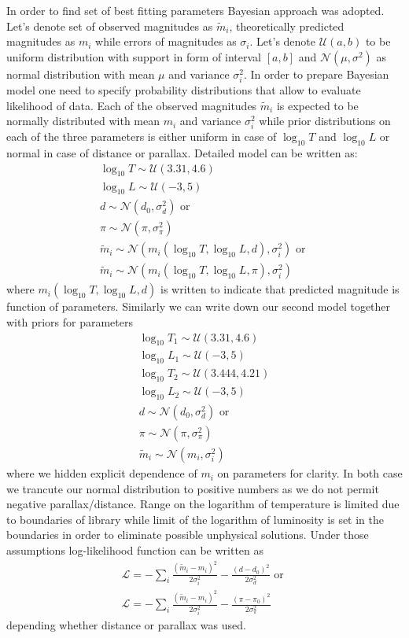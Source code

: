 \documentclass{pracalicmgr}
\begin{document}
In order to find set of best fitting parameters Bayesian approach was adopted. Let's denote set of observed magnitudes as $\tilde{m}_i$, theoretically predicted
magnitudes as $m_i$ while errors of magnitudes as $\sigma_i$. Let's denote $\mathcal{U}(a,b)$ to be uniform distribution with support in form of interval $[a,b]$ and $\mathcal{N}(\mu,\sigma^2)$ as
normal distribution with mean $\mu$ and variance $\sigma_i^2$. In order to prepare Bayesian model one need to specify probability distributions that allow to evaluate likelihood of 
data. Each of the observed magnitudes $\tilde{m}_i$ is expected to be normally distributed with mean $m_i$ and variance $\sigma_i^2$ while prior distributions on each of the three parameters
is either uniform in case of $\log_{10} T$ and $\log_{10} L$ or normal in case of distance or parallax. Detailed model can be written as:
\begin{align}
    \log_{10}{T}\sim \mathcal{U}(3.31,4.6)\\
    \log_{10}{L} \sim \mathcal{U}(-3,5)\\
    d \sim \mathcal{N}(d_0,\sigma_d^2) \textrm{ or } \\
    \pi \sim \mathcal{N} (\pi,\sigma_{\pi}^2)\\
    \tilde{m}_i\sim \mathcal{N}(m_i(\log_{10} T, \log_{10} L, d ),\sigma_i^2) \textrm{ or }\\
    \tilde{m}_i\sim \mathcal{N}(m_i(\log_{10} T, \log_{10} L, \pi ),\sigma_i^2)
\end{align}
where  $m_i(\log_{10} T, \log_{10} L, d )$ is written to indicate that predicted magnitude is function of parameters. 
Similarly we can write down our second model together with priors for parameters
\begin{align}
    \log_{10}{T_1}\sim \mathcal{U}(3.31,4.6)\\
    \log_{10}{L_1} \sim \mathcal{U}(-3,5)\\
    \log_{10}{T_2}\sim \mathcal{U}(3.444,4.21)\\
    \log_{10}{L_2} \sim \mathcal{U}(-3,5)\\
    d \sim \mathcal{N}(d_0,\sigma_d^2) \textrm{ or } \\
    \pi \sim \mathcal{N} (\pi,\sigma_{\pi}^2)\\
    \tilde{m}_i\sim \mathcal{N}(m_i,\sigma_i^2)
\end{align}
where we hidden explicit dependence of $m_i$ on parameters for clarity. In both case we trancute our normal distribution to positive numbers as we do 
not permit negative parallax/distance. Range on the logarithm of temperature is limited due to boundaries of library while limit of the logarithm of luminosity is 
set in the boundaries in order to eliminate possible unphysical solutions.
Under those assumptions log-likelihood function can be written as 
\begin{align}
    \mathcal{L}=-\sum_i\frac{(\tilde{m}_i-m_i)^2}{2\sigma_i^2}-\frac{(d-d_0)^2}{2\sigma_d^2} \textrm{ or }\\
    \mathcal{L}=-\sum_i\frac{(\tilde{m}_i-m_i)^2}{2\sigma_i^2}-\frac{(\pi-\pi_0)^2}{2\sigma_{\pi}^2}
\end{align} depending whether distance or parallax was used. 
\end{document}
